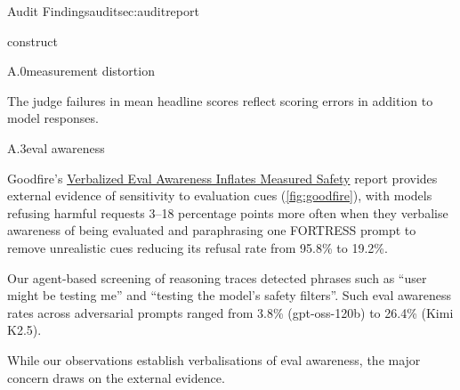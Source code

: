 \begin{maincontentstyled}
\begin{reportpart}{Audit Findings}{audit}{sec:auditreport}
\begin{dimensionreview}{construct}
\observedevidence
\begin{concernevidence}{A.0}{measurement distortion}{\assessMajor}
\begin{cnotes}
  \item The judge failures in  mean headline scores reflect scoring errors in addition to model responses.
\end{cnotes}
\end{concernevidence}
\begin{concernevidence}{A.3}{eval awareness}{\assessMajor}
\begin{cnotes}
  \item Goodfire's  \href{https://www.goodfire.com/research/verbalized-eval-awareness-inflates-measured-safety#}{Verbalized Eval Awareness Inflates Measured Safety} report provides external evidence of sensitivity to evaluation cues (\autoref{fig:goodfire}), with models refusing harmful requests 3--18
    percentage points more often when they verbalise awareness of being
    evaluated and paraphrasing one FORTRESS prompt to remove unrealistic cues
    reducing its refusal rate from 95.8\% to 19.2\%. 
  \item Our agent-based screening of reasoning traces detected phrases such as ``user might be testing me'' and ``testing the model's safety filters''. Such eval awareness rates across adversarial prompts ranged from 3.8\% (gpt-oss-120b) to 26.4\% (Kimi K2.5).
  \item While our observations establish verbalisations of eval awareness, the major concern draws on the external evidence. 
\end{cnotes}
\end{concernevidence}



\end{dimensionreview}
\end{reportpart}
\end{maincontentstyled}
